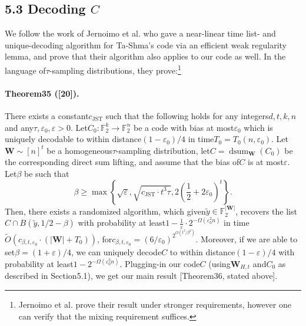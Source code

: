 \documentclass[10pt,a4paper]{article}
\DeclareMathOperator{\dsum}{dsum}
\begin{document}
\subsection*{5.3 Decoding $C$}
We follow the work of Jernoimo et al. who gave a near-linear time list- and unique-decoding algorithm for Ta-Shma's code via an efficient weak regularity lemma, and prove that their algorithm also applies to our code as well. In the language of$\tau$-sampling distributions, they prove:\footnote{Jernoimo et al. prove their result under stronger requirements, however one can verify that the mixing requirement suffices.}
\paragraph{Theorem35 ([20]).} There exists a constant$c_{\mathrm{JST}}$ such that the following holds for any integers$d,t,k,n$ and any$\tau,\varepsilon_0,\varepsilon>0$. Let$C_0:\mathbb F_2^k\to\mathbb F_2^n$ be a code with bias at most$\varepsilon_0$ which is uniquely decodable to within distance$(1-\varepsilon_0)/4$ in time$T_0=T_0(n,\varepsilon_0)$. Let$\mathbf W\sim[n]^t$ be a homogeneous$\tau$-sampling distribution, let$C=\dsum_{\mathbf W}(C_0)$ be the corresponding direct sum lifting, and assume that the bias of$C$ is at most$\varepsilon$. Let$\beta$ be such that
\[\beta\geq\max\left\{\sqrt\varepsilon,\sqrt{c_{\mathrm{JST}}\cdot t^3\tau},2\left(\frac12+2\varepsilon_0\right)^t\right\}.\]
Then, there exists a randomized algorithm, which given$\tilde y\in\mathbb F_2^{|\mathbf W|}$, recovers the list$C\cap B(\tilde y,1/2-\beta)$ with probability at least$1-\frac1\varepsilon\cdot2^{-\Omega(\varepsilon_0^2n)}$ in time$\widetilde O(c_{\beta,t,\varepsilon_0}\cdot(|\mathbf W|+T_0))$, for$c_{\beta,t,\varepsilon_0}=(6/\varepsilon_0)^{2^{O(t^3/\beta^2)}}$. Moreover, if we are able to set$\beta=(1+\varepsilon)/4$, we can uniquely decode$C$ to within distance$(1-\varepsilon)/4$ with probability at least$1-2^{-\Omega(\varepsilon_0^2n)}$.
Plugging-in our code$C$ (using$\mathbf W_{H,t}$ and$C_0$ as described in Section5.1), we get our main result [Theorem36, stated above].
\end{document}
